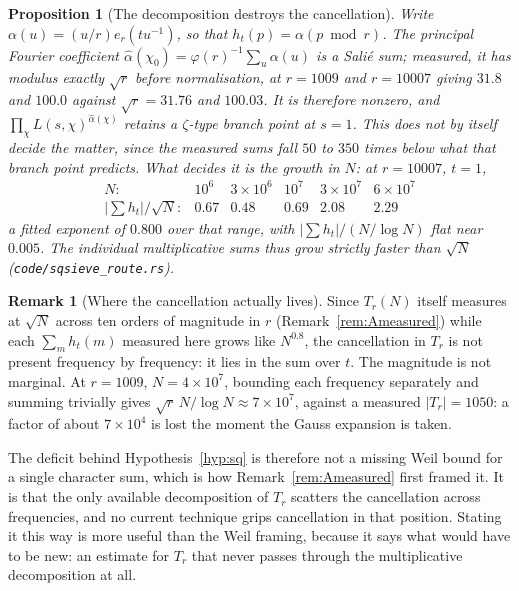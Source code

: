 \documentclass[11pt]{article}
\newtheorem{proposition}[theorem]{Proposition}
\theoremstyle{definition}
\newtheorem{remark}[theorem]{Remark}
\begin{document}
\begin{proposition}[The decomposition destroys the cancellation]\label{prop:routeclosed}
Write $\alpha(u)=(u/r)e_r(t u^{-1})$, so that $h_t(p)=\alpha(p\bmod r)$. The principal Fourier
coefficient $\widehat\alpha(\chi_0)=\varphi(r)^{-1}\sum_u\alpha(u)$ is a Sali\'e sum; measured, it has
modulus exactly $\sqrt r$ before normalisation, at $r=1009$ and $r=10007$ giving $31.8$ and $100.0$
against $\sqrt r=31.76$ and $100.03$. It is therefore nonzero, and $\prod_\chi
L(s,\chi)^{\widehat\alpha(\chi)}$ retains a $\zeta$-type branch point at $s=1$. This does \emph{not}
by itself decide the matter, since the measured sums fall $50$ to $350$ times below what that branch
point predicts. What decides it is the growth in $N$: at $r=10007$, $t=1$,
\[
\begin{array}{lrrrrr}
N: & 10^6 & 3\times10^6 & 10^7 & 3\times10^7 & 6\times10^7\\
|\sum h_t|/\sqrt N: & 0.67 & 0.48 & 0.69 & 2.08 & 2.29
\end{array}
\]
a fitted exponent of $0.800$ over that range, with $|\sum h_t|/(N/\log N)$ flat near $0.005$. The
individual multiplicative sums thus grow strictly faster than $\sqrt N$
\textup{(\texttt{code/sqsieve\_route.rs})}.
\end{proposition}

\begin{remark}[Where the cancellation actually lives]\label{rem:whereitlives}
Since $T_r(N)$ itself measures at $\sqrt N$ across ten orders of magnitude in $r$
(Remark~\ref{rem:Ameasured}) while each $\sum_m h_t(m)$ measured here grows like $N^{0.8}$, the
cancellation in $T_r$ is not present frequency by frequency: it lies in the sum over $t$. The
magnitude is not marginal. At $r=1009$, $N=4\times10^7$, bounding each frequency separately and
summing trivially gives $\sqrt r\,N/\log N\approx7\times10^{7}$, against a measured
$|T_r|=1050$: a factor of about $7\times10^{4}$ is lost the moment the Gauss expansion is taken.

The deficit behind Hypothesis~\ref{hyp:sq} is therefore not a missing Weil bound for a single
character sum, which is how Remark~\ref{rem:Ameasured} first framed it. It is that the only
available decomposition of $T_r$ scatters the cancellation across frequencies, and no current
technique grips cancellation in that position. Stating it this way is more useful than the
Weil framing, because it says what would have to be new: an estimate for $T_r$ that never passes
through the multiplicative decomposition at all.
\end{remark}
\end{document}
